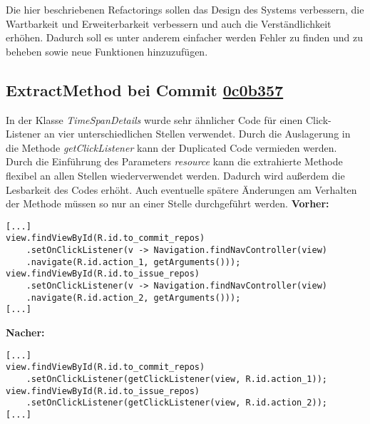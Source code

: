 \documentclass[12pt]{article}
\begin{document}
Die hier beschriebenen Refactorings sollen das Design des Systems verbessern, die Wartbarkeit und Erweiterbarkeit verbessern und auch die Verständlichkeit erhöhen.
Dadurch soll es unter anderem einfacher werden Fehler zu finden und zu beheben sowie neue Funktionen hinzuzufügen.


\subsection{ExtractMethod bei Commit \href{https://github.com/lukaspanni/OpenSourceStats/commit/0c0b357dee742575d8465ae26e64152bfecbf5ab} {0c0b357}}
\label{sec:ExtractMethod_TimeSpanDetails}

In der Klasse \textit{TimeSpanDetails} wurde sehr ähnlicher Code für einen Click-Listener an vier unterschiedlichen Stellen verwendet. Durch die Auslagerung in die Methode \textit{getClickListener}  kann der Duplicated Code vermieden werden. Durch die Einführung des Parameters \textit{resource} kann die extrahierte Methode flexibel an allen Stellen wiederverwendet werden. Dadurch wird außerdem die Lesbarkeit des Codes erhöht.
Auch eventuelle spätere Änderungen am Verhalten der Methode müssen so nur an einer Stelle durchgeführt werden.
\newline
\textbf{Vorher:} 
\begin{lstlisting}[breaklines=false]
[...]
view.findViewById(R.id.to_commit_repos)
    .setOnClickListener(v -> Navigation.findNavController(view)
    .navigate(R.id.action_1, getArguments()));
view.findViewById(R.id.to_issue_repos)
    .setOnClickListener(v -> Navigation.findNavController(view)
    .navigate(R.id.action_2, getArguments()));
[...]
\end{lstlisting}
\textbf{Nacher:} 
\begin{lstlisting}[breaklines=false]
[...]
view.findViewById(R.id.to_commit_repos)
    .setOnClickListener(getClickListener(view, R.id.action_1));
view.findViewById(R.id.to_issue_repos)
    .setOnClickListener(getClickListener(view, R.id.action_2));
[...]
\end{lstlisting}
\end{document}
